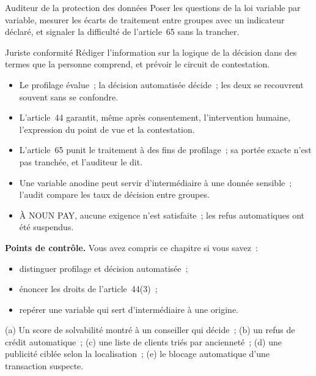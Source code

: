\begin{boxmetier}{Auditeur de la protection des données}
Poser les questions de la loi variable par variable, mesurer les écarts de
traitement entre groupes avec un indicateur déclaré, et signaler la
difficulté de l'article~65 sans la trancher.
\end{boxmetier}

\begin{boxmetier}{Juriste conformité}
Rédiger l'information sur la logique de la décision dans des termes que la
personne comprend, et prévoir le circuit de contestation.
\end{boxmetier}

\begin{boxresume}
\begin{itemize}
    \item Le profilage évalue~; la décision automatisée décide~; les deux
          se recouvrent souvent sans se confondre.
    \item L'article~44 garantit, même après consentement, l'intervention
          humaine, l'expression du point de vue et la contestation.
    \item L'article~65 punit le traitement à des fins de profilage~; sa
          portée exacte n'est pas tranchée, et l'auditeur le dit.
    \item Une variable anodine peut servir d'intermédiaire à une donnée
          sensible~; l'audit compare les taux de décision entre groupes.
    \item À NOUN PAY, aucune exigence n'est satisfaite~; les refus
          automatiques ont été suspendus.
\end{itemize}
\end{boxresume}

\begin{boxinfo}
\textbf{Points de contrôle.} Vous avez compris ce chapitre si vous savez~:
\begin{itemize}
    \item distinguer profilage et décision automatisée~;
    \item énoncer les droits de l'article~44(3)~;
    \item repérer une variable qui sert d'intermédiaire à une origine.
\end{itemize}
\end{boxinfo}

\begin{boxexo}[title={\ding{45}\quad Exercice~14.1. Profilage, décision, ni l'un ni l'autre \niveaubase}]
(a) Un score de solvabilité montré à un conseiller qui décide~; (b) un
refus de crédit automatique~; (c) une liste de clients triés par ancienneté~;
(d) une publicité ciblée selon la localisation~; (e) le blocage automatique
d'une transaction suspecte.
\end{boxexo}


